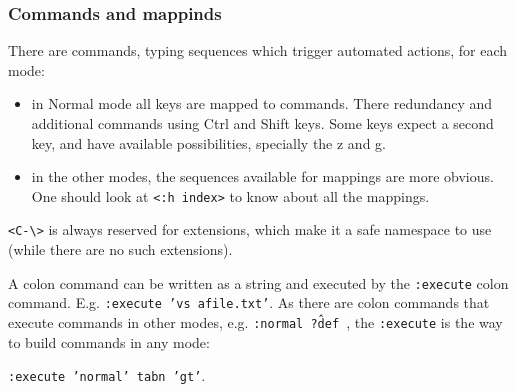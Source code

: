 \documentclass{article}
\newcommand{\ttt}[1] {
	\texttt{<#1>}}
\newcommand{\tttt}[1] {
	\texttt{#1}}
\begin{document}
\subsubsection{Commands and mappinds}
There are commands, typing sequences which trigger automated actions,
for each mode:
\begin{itemize}
	\item in Normal mode all keys are mapped to commands.
		There redundancy and additional commands
		using Ctrl and Shift keys.
		Some keys expect a second key,
		and have available possibilities,
		specially the z and g.
	\item in the other modes, the sequences available for mappings are more obvious. One should look at \ttt{:h index} to know about all the mappings.
\end{itemize}

\ttt{C-\textbackslash} is always reserved for extensions,
which make it a safe namespace to use (while there are no
such extensions).

A colon command can be written as a string
and executed by the \tttt{:execute} colon command.
E.g. \tttt{:execute 'vs afile.txt'}.
As there are colon commands that execute commands in other
modes, e.g. \tttt{:normal ?\^def },
the \tttt{:execute} is the way to build commands in any mode:
\tttt{:execute 'normal' tabn 'gt'}.
\end{document}
